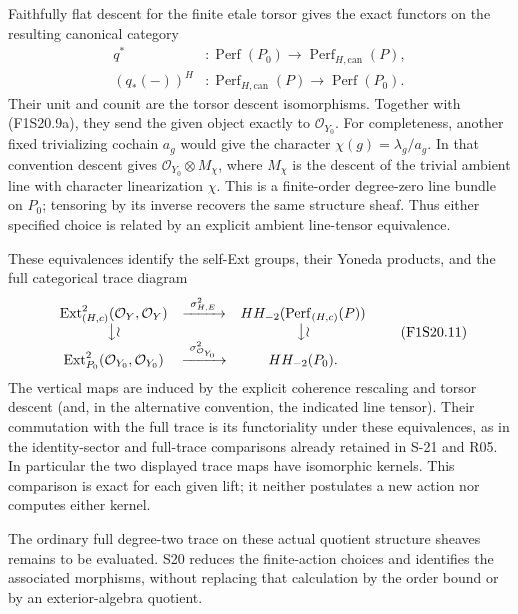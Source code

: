Faithfully flat descent for the finite etale torsor gives
the exact functors on the resulting canonical category
\[
 \begin{split}
 q^*&:\operatorname{Perf}(P_0)\longrightarrow
                              \operatorname{Perf}_{H,\mathrm{can}}(P),\\
 (q_*(-))^H&:\operatorname{Perf}_{H,\mathrm{can}}(P)\longrightarrow
                              \operatorname{Perf}(P_0).
 \end{split}
 \tag{F1S20.10}
\]
Their unit and counit are the torsor descent isomorphisms.
Together with (F1S20.9a), they send the given object
exactly to $\mathcal O_{Y_0}$. For completeness, another
fixed trivializing cochain $a_g$ would give the character
$\chi(g)=\lambda_g/a_g$. In that convention descent gives
$\mathcal O_{Y_0}\otimes M_\chi$, where $M_\chi$ is the
descent of the trivial ambient line with character
linearization $\chi$. This is a finite-order degree-zero
line bundle on $P_0$; tensoring by its inverse recovers
the same structure sheaf. Thus either specified choice
is related by an explicit ambient line-tensor equivalence.

These equivalences identify the self-Ext groups, their Yoneda
products, and the full categorical trace diagram
\[
\begin{array}{ccc}
 \operatorname{Ext}^2_{(H,c)}(\mathcal O_Y,\mathcal O_Y)
       &\xrightarrow{\ \sigma^2_{H,E}\ }&
                   HH_{-2}(\operatorname{Perf}_{(H,c)}(P))\\
 \big\downarrow\wr&&\big\downarrow\wr\\
 \operatorname{Ext}^2_{P_0}(\mathcal O_{Y_0},\mathcal O_{Y_0})
       &\xrightarrow{\ \sigma^2_{\mathcal O_{Y_0}}\ }&
                   HH_{-2}(P_0).
\end{array}
 \tag{F1S20.11}
\]
The vertical maps are induced by the explicit coherence
rescaling and torsor descent (and, in the alternative
convention, the indicated line tensor). Their commutation with the
full trace is its functoriality under these equivalences,
as in the identity-sector and full-trace comparisons
already retained in S-21 and R05. In particular the two
displayed trace maps have isomorphic kernels. This
comparison is exact for each given lift; it neither
postulates a new action nor computes either kernel.

The ordinary full degree-two trace on these actual
quotient structure sheaves remains to be evaluated.
S20 reduces the finite-action choices and identifies the
associated morphisms, without replacing that calculation
by the order bound or by an exterior-algebra quotient.
